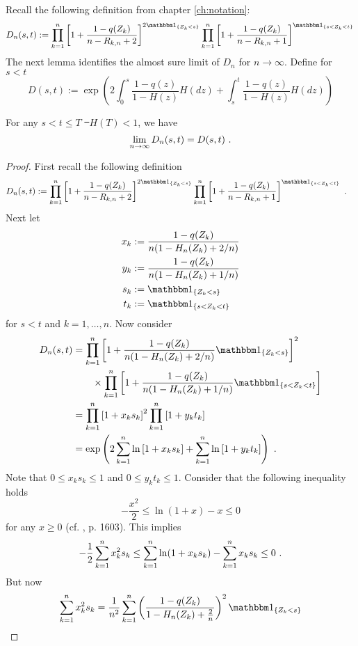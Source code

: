 %
Recall the following  definition from chapter \ref{ch:notation}:
$$D_n(s,t) := \prod_{k=1}^{n} \left[1+\frac{1-q(Z_k)}{n-R_{k,n} +2}\right]^{2\I{Z_k<s}} \prod_{k=1}^{n}\left[1+\frac{1-q(Z_k)}{n-R_ {k,n}+1}\right]^{\I{s < Z_k < t}}\\$$
The next lemma identifies the almost sure limit of $D_n$ for $n\to\infty$. Define for $s<t$
$$D(s,t) := \exp\left(2\int_{0}^{s} \frac{1-q(z)}{1-H(z)} H(dz) + \int_{s}^{t} \frac{1-q(z)}{1-H(z)} H(dz)\right)$$
\begin{lemma} \label{lem:dn_limit}
	For any $s < t \leq T$ \st\ $H(T)<1$, we have
	$$\lim\limits_{n\to\infty}D_n(s,t) = D(s,t)\textrm{ .}$$
	\begin{proof}
		First recall the following definition
		\begin{align*}
		D_n(s,t) &:= \prod_{k=1}^{n} \left[1+\frac{1-q(Z_k)}{n-R_{k,n} +2}\right]^{2\I{Z_k<s}} \prod_{k=1}^{n}\left[1+\frac{1-q(Z_k)}{n-R_ {k,n}+1}\right]^{\I{s < Z_k < t}} \mdot
		\end{align*}
		Next let 
		\begin{align*}
		x_k &:= \frac{1-q(Z_k)}{n(1- H_n(Z_k) + 2/n)}\\
		y_k &:= \frac{1-q(Z_k)}{n(1- H_n(Z_k) + 1/n)}\\
		s_k &:= \I{Z_k < s} \\
		t_k &:= \I{s < Z_k < t}
		\end{align*}
		for $s<t$ and $k=1,\dots,n$.
		Now consider 
		\begin{align*}
		D_n(s,t) &= \prod_{k=1}^{n} \left[1+\frac{1-q(Z_k)}{n(1- H_n(Z_k) + 2/n)}\I{Z_k<s}\right]^{2}\\ 
		&\qquad \times \prod_{k=1}^{n}\left[1+\frac{1-q(Z_k)}{n(1-H_n(Z_k)+1/n)}\I{s < Z_k < t}\right]\\
		&= \prod_{k=1}^{n} \left[1+x_k s_k\right]^{2} \prod_{k=1}^{n}\left[1+y_k t_k\right]\\
		&= \exp\left(2\sum_{k=1}^{n}\ln\left[1+x_k s_k\right] + \sum_{k=1}^{n}\ln\left[1+y_k t_k\right]\right)\mdot
		\end{align*}
		Note that $0 \leq x_k s_k \leq 1$ and $0 \leq y_k t_k \leq 1$. Consider that the following inequality holds  
		$$-\frac{x^2}{2} \leq \ln(1+x) - x \leq 0$$ 
		for any $x \geq 0$ (cf.  \cite{stute1993strong}, p. 1603). This implies 
		$$-\frac{1}{2}\sum_{k=1}^{n}x_k^2 s_k \leq \sum_{k=1}^{n}\ln(1+x_k s_k) - \sum_{k=1}^{n}x_k s_k \leq 0\textrm{ .}$$ 
		But now 
		\begin{align*}
		\sum_{k=1}^{n} x_k^2 s_k &= \frac{1}{n^2} \sum_{k=1}^{n} \left(\frac{1-q(Z_k)}{1-H_n(Z_k)+\frac{2}{n}}\right)^2\I{Z_k<s}\\

\end{align*}
\end{proof}
\end{lemma}
